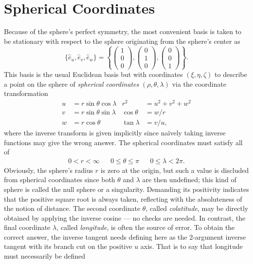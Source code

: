 \documentclass[11pt,dvipsnames]{thesis}
\begin{document}
\section{Spherical Coordinates} \label{subsec:Spherical Coordinates}
Because of the sphere's perfect symmetry, the most convenient basis is taken to be stationary with respect to the sphere originating from the sphere's center as
\begin{equation}
\{\hat{e}_u, \hat{e}_v, \hat{e}_w\} = \left\{\begin{pmatrix}1 \\ 0 \\ 0\end{pmatrix}, \begin{pmatrix}0 \\ 1 \\ 0\end{pmatrix}, \begin{pmatrix}0 \\ 0 \\ 1\end{pmatrix}\right\}.
\end{equation}
This basis is the usual Euclidean basis but with coordinates $(\xi,\eta,\zeta)$ to describe a point on the sphere of \textit{spherical coordinates} $(\rho, \theta, \lambda)$ via the coordinate transformation
\begin{align}
u &= r \sin\theta \cos\lambda & r^2 &= u^2 + v^2 + w^2 \\
v &= r \sin\theta \sin\lambda & \cos\theta &= w/r \\%
w &= r \cos\theta & \tan\lambda &= v/u,%
\end{align}
where the inverse transform is given implicitly since na\"{i}vely taking inverse functions may give the wrong answer. The spherical coordinates must satisfy all of
\begin{align}
0 < r < \infty && 0 \leqslant \theta \leqslant \pi && 0 \leqslant \lambda < 2\pi.
\end{align}
Obviously, the sphere's radius $r$ is zero at the origin, but such a value is discluded from spherical coordinates since both $\theta$ and $\lambda$ are then undefined; this kind of sphere is called the null sphere or a singularity. Demanding its positivity indicates that the positive square root is always taken, reflecting with the absoluteness of the notion of distance. The second coordinate $\theta$, called \textit{colatitude}, may be directly obtained by applying the inverse cosine --- no checks are needed. In contrast, the final coordinate $\lambda$, called \textit{longitude}, is often the source of error. To obtain the correct answer, the inverse tangent needs defining here as the 2-argument inverse tangent with its branch cut on the positive $u$ axis. That is to say that longitude must necessarily be defined
\end{document}
